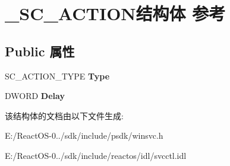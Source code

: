 \hypertarget{struct___s_c___a_c_t_i_o_n}{}\section{\+\_\+\+S\+C\+\_\+\+A\+C\+T\+I\+O\+N结构体 参考}
\label{struct___s_c___a_c_t_i_o_n}
\subsection*{Public 属性}
\begin{DoxyCompactItemize}
\item 
\mbox{\label{struct___s_c___a_c_t_i_o_n_a954d2963c53f373e2661ac535117b326}} 
S\+C\+\_\+\+A\+C\+T\+I\+O\+N\+\_\+\+T\+Y\+PE {\bfseries Type}
\item 
\mbox{\label{struct___s_c___a_c_t_i_o_n_a3d5463bbfa28b5d1704c3284c6c5f246}} 
D\+W\+O\+RD {\bfseries Delay}
\end{DoxyCompactItemize}


该结构体的文档由以下文件生成\+:\begin{DoxyCompactItemize}
\item 
E\+:/\+React\+O\+S-\/0../sdk/include/psdk/winsvc.\+h\item 
E\+:/\+React\+O\+S-\/0../sdk/include/reactos/idl/svcctl.\+idl\end{DoxyCompactItemize}
